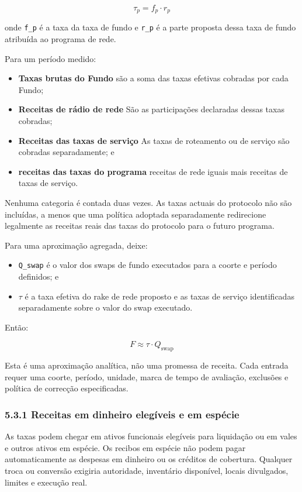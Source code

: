 \documentclass[11pt]{article}
\begin{document}
\[
\tau_p = f_p \cdot r_p
\]

onde \texttt{f\_p} é a taxa da taxa de fundo e \texttt{r\_p} é a parte proposta dessa taxa de fundo atribuída ao programa de rede.

Para um período medido:

\begin{itemize}[leftmargin=*]
\item \textbf{Taxas brutas do Fundo} são a soma das taxas efetivas cobradas por cada Fundo;
\item \textbf{Receitas de rádio de rede} São as participações declaradas dessas taxas cobradas;
\item \textbf{Receitas das taxas de serviço} As taxas de roteamento ou de serviço são cobradas separadamente; e
\item \textbf{receitas das taxas do programa} receitas de rede iguais mais receitas de taxas de serviço.
\end{itemize}
Nenhuma categoria é contada duas vezes. As taxas actuais do protocolo não são incluídas, a menos que uma política adoptada separadamente redirecione legalmente as receitas reais das taxas do protocolo para o futuro programa.

Para uma aproximação agregada, deixe:

\begin{itemize}[leftmargin=*]
\item \texttt{Q\_swap} é o valor dos swaps de fundo executados para a coorte e período definidos; e
\item \texttt{$\tau$} é a taxa efetiva do rake de rede proposto e as taxas de serviço identificadas separadamente sobre o valor do swap executado.
\end{itemize}
Então:

\[
F \approx \tau \cdot Q_{\mathrm{swap}}
\]

Esta é uma aproximação analítica, não uma promessa de receita. Cada entrada requer uma coorte, período, unidade, marca de tempo de avaliação, exclusões e política de correcção especificadas.

\subsubsection*{5.3.1 Receitas em dinheiro elegíveis e em espécie}

As taxas podem chegar em ativos funcionais elegíveis para liquidação ou em vales e outros ativos em espécie. Os recibos em espécie não podem pagar automaticamente as despesas em dinheiro ou os créditos de cobertura. Qualquer troca ou conversão exigiria autoridade, inventário disponível, locais divulgados, limites e execução real.
\end{document}
